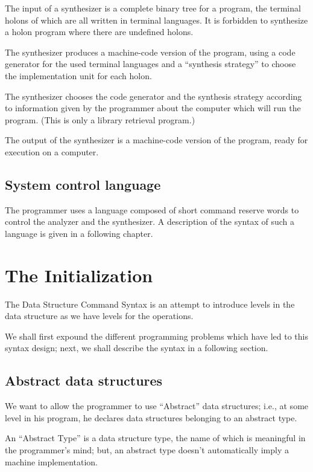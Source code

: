 \documentclass[openany,nobib]{tufte-book}
\begin{document}
\noindent The input of a synthesizer is a complete binary tree for a program,
the terminal holons of which are all written in terminal languages. It is
forbidden to synthesize a holon program where there are undefined holons.

The synthesizer produces a machine-code version of the program, using a code
generator for the used terminal languages and a ``synthesis strategy'' to
choose the implementation unit for each holon.

The synthesizer chooses the code generator and the synthesis strategy according
to information given by the programmer about the computer which will run the
program. (This is only a library retrieval program.)

The output of the synthesizer is a machine-code version of the program, ready
for execution on a computer.

\section{System control language}

\noindent The programmer uses a language composed of short command reserve
words to control the analyzer and the synthesizer.
A description of the syntax of such a language is given in a following chapter.

\chapter{The Initialization}

The Data Structure Command Syntax is an attempt to introduce levels in the data
structure as we have levels for the operations.

We shall first expound the different programming problems which have led to
this syntax design; next, we shall describe the syntax in a following section.

\section{Abstract data structures}

We want to allow the programmer to use ``Abstract'' data structures; i.e., at
some level in his program, he declares data structures belonging to an abstract
type.

An ``Abstract Type'' is a data structure type, the name of which is meaningful
in the programmer's mind; but, an abstract type doesn't automatically imply a
machine implementation.
\end{document}
